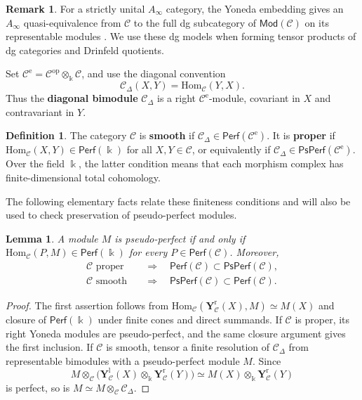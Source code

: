 \documentclass[11pt,letterpaper,reqno]{amsart}
\theoremstyle{plain}
\newtheorem{lemma}[lemma]{Lemma}
\theoremstyle{definition}
\newtheorem{definition}[definition]{Definition}
\newtheorem{remark}[remark]{Remark}
\theoremstyle{plain}
\theoremstyle{definition}
\numberwithin{equation}{section}
\begin{document}
\begin{remark}
For a strictly unital $A_\infty$ category, the Yoneda embedding gives an $A_\infty$ quasi-equivalence from $\mathscr C$ to the full dg subcategory of $\mathsf{Mod}(\mathscr C)$ on its representable modules \cite[Sections 2f--2g]{Seidel2008}.
We use these dg models when forming tensor products of dg categories and Drinfeld quotients.
\end{remark}

Set $\mathscr C^{\mathrm e}=\mathscr C^{\mathrm{op}}\otimes_{\Bbbk}\mathscr C$, and use the diagonal convention
\[
\mathscr C_\Delta(X,Y)=\mathrm{Hom}_{\mathscr C}(Y,X).
\]
Thus the \textbf{diagonal bimodule} $\mathscr C_\Delta$ is a right $\mathscr C^{\mathrm e}$-module, covariant in $X$ and contravariant in $Y$.

\begin{definition}\label{def:smooth-proper}
The category $\mathscr C$ is \textbf{smooth} if $\mathscr C_\Delta\in\mathsf{Perf}(\mathscr C^{\mathrm e})$.
It is \textbf{proper} if $\mathrm{Hom}_{\mathscr C}(X,Y)\in\mathsf{Perf}(\Bbbk)$ for all $X,Y\in\mathscr C$, or equivalently if $\mathscr C_\Delta\in\mathsf{PsPerf}(\mathscr C^{\mathrm e})$.
Over the field $\Bbbk$, the latter condition means that each morphism complex has finite-dimensional total cohomology.
\end{definition}

The following elementary facts relate these finiteness conditions and will also be used to check preservation of pseudo-perfect modules.

\begin{lemma}\label{lem:module-finiteness}
A module $M$ is pseudo-perfect if and only if $\mathrm{Hom}_{\mathscr C}(P,M)\in\mathsf{Perf}(\Bbbk)$ for every $P\in\mathsf{Perf}(\mathscr C)$.
Moreover,
\[
\begin{aligned}
\mathscr C\text{ proper}&\quad\Longrightarrow\quad\mathsf{Perf}(\mathscr C)\subset\mathsf{PsPerf}(\mathscr C),\\
\mathscr C\text{ smooth}&\quad\Longrightarrow\quad\mathsf{PsPerf}(\mathscr C)\subset\mathsf{Perf}(\mathscr C).
\end{aligned}
\]
\end{lemma}
\begin{proof}
The first assertion follows from $\mathrm{Hom}_{\mathscr C}(\mathbf Y_{\mathscr C}^{\mathrm r}(X),M)\simeq M(X)$ and closure of $\mathsf{Perf}(\Bbbk)$ under finite cones and direct summands.
If $\mathscr C$ is proper, its right Yoneda modules are pseudo-perfect, and the same closure argument gives the first inclusion.
If $\mathscr C$ is smooth, tensor a finite resolution of $\mathscr C_\Delta$ from representable bimodules with a pseudo-perfect module $M$.
Since
\[
M\otimes_{\mathscr C} 
\bigl(\mathbf Y_{\mathscr C}^{\mathrm l}(X)\otimes_{\Bbbk}\mathbf Y_{\mathscr C}^{\mathrm r}(Y)\bigr)
\simeq M(X)\otimes_{\Bbbk}\mathbf Y_{\mathscr C}^{\mathrm r}(Y)
\]
is perfect, so is $M\simeq M\otimes_{\mathscr C} \mathscr C_\Delta$.
\end{proof}
\end{document}
